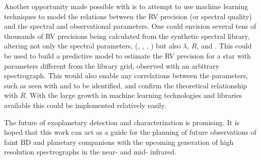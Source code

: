 Another opportunity made possible with \eniric{} is to attempt to use machine learning techniques to model the relations between the {RV} precision (or spectral quality) and the spectral and observational parameters.
One could envision several tens of thousands of {RV} precisions being calculated from the synthetic spectral library, altering not only the spectral parameters, (\Teff, \Logg{}, \feh{}, \alphafe{}) but also \(\lambda\), \(R\), \Vsini{} and \snr{}.
This could be used to build a predictive model to estimate the {RV} precision for a star with parameters different from the library grid, observed with an arbitrary spectrograph.
This would also enable any correlations between the parameters, such as seen with \Logg{} and \feh{} to be identified, and confirm the theoretical relationship with \(R\).
With the large growth in machine learning technologies and libraries available this could be implemented relatively easily.

The future of exoplanetary detection and characterization is promising.
It is hoped that this work can act as a guide for the planning of future observations of faint {BD} and planetary companions with the upcoming generation of high resolution spectrographs in the near- and mid- infrared.
